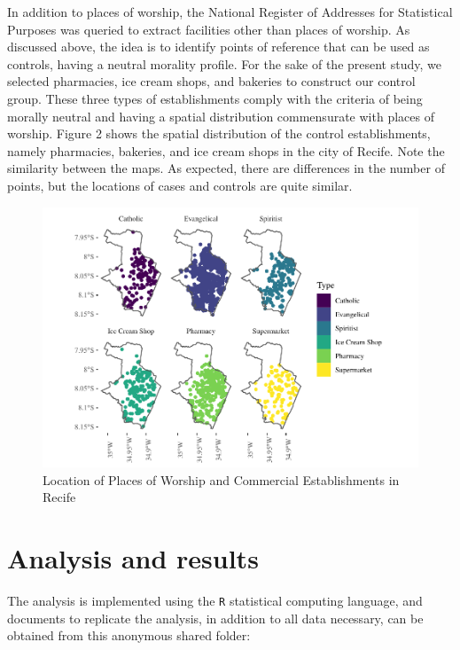\documentclass[smallextended]{svjour3}       %
\begin{document}
In addition to places of worship, the National Register of Addresses for
Statistical Purposes was queried to extract facilities other than places
of worship. As discussed above, the idea is to identify points of
reference that can be used as controls, having a neutral morality
profile. For the sake of the present study, we selected pharmacies, ice
cream shops, and bakeries to construct our control group. These three
types of establishments comply with the criteria of being morally
neutral and having a spatial distribution commensurate with places of
worship. Figure 2 shows the spatial distribution of the control
establishments, namely pharmacies, bakeries, and ice cream shops in the
city of Recife. Note the similarity between the maps. As expected, there
are differences in the number of points, but the locations of cases and
controls are quite similar.

\begin{figure}

\includegraphics{Moral_Communities_and_Crime_v1_files/figure-latex/fig-plot-events-1} \hfill{}

\caption{\label{fig:plot-events}Location of Places of Worship and Commercial Establishments in Recife}\label{fig:fig-plot-events}
\end{figure}

\hypertarget{results}{%
\section{Analysis and results}\label{results}}

The analysis is implemented using the \texttt{R} statistical computing
language, and documents to replicate the analysis, in addition to all
data necessary, can be obtained from this anonymous shared folder:
\end{document}
